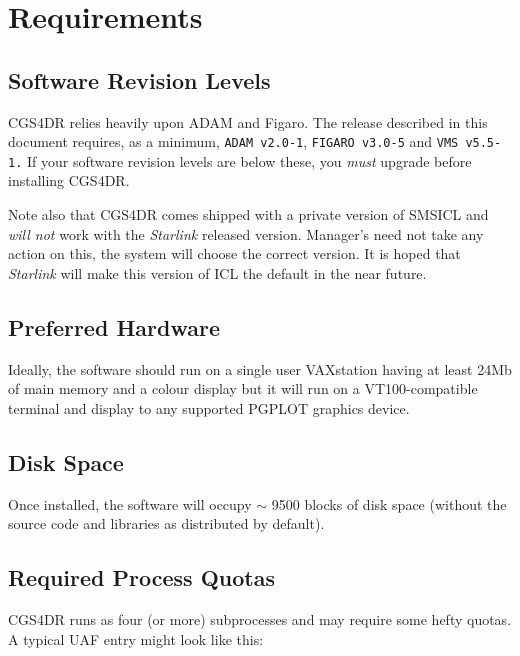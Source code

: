 \section{Requirements}

\subsection{Software Revision Levels}

CGS4DR relies heavily upon ADAM and Figaro. The release described in this
document requires, as a minimum, {\tt ADAM v2.0-1}, {\tt FIGARO v3.0-5} and
{\tt VMS v5.5-1.} If your software revision levels are below these, you
{\em must} upgrade before installing CGS4DR.

Note also that CGS4DR comes shipped with a private version of SMSICL and
{\em will not} work with the {\sl Starlink} released version. Manager's
need not take any action on this, the system will choose the correct version.
It is hoped that {\sl Starlink} will make this version of ICL the default
in the near future.

\subsection{Preferred Hardware}

Ideally, the software should run on a single user VAXstation having
at least 24Mb of main memory and a colour display but it will run on a
VT100-compatible terminal and display to any supported PGPLOT graphics device.

\subsection{Disk Space}

Once installed, the software will occupy $\sim$ 9500 blocks of disk space
(without the source code and libraries as distributed by default).

\subsection{Required Process Quotas}

CGS4DR runs as four (or more) subprocesses and may require
some hefty quotas. A typical UAF entry might look like this:

